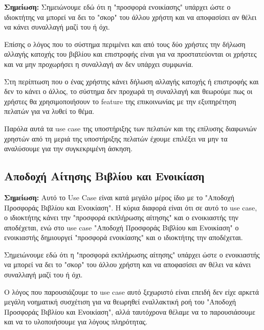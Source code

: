 \documentclass[12pt,a4paper]{article}
\begin{document}
\textbf{Σημείωση:} Σημειώνουμε εδώ ότι η "προσφορά ενοικίασης" υπάρχει ώστε ο ιδιοκτήτης να μπορεί να δει το "σκορ" του άλλου χρήστη και να αποφασίσει αν θέλει να κάνει συναλλαγή μαζί του ή όχι.

Επίσης ο λόγος που το σύστημα περιμένει και από τους δύο χρήστες την δήλωση αλλαγής κατοχής του βιβλίου και επιστροφής είναι για να προστατεύονται οι χρήστες και να μην προχωρήσει η συναλλαγή αν δεν υπάρχει συμφωνία.

Στη περίπτωση που ο ένας χρήστης κάνει δήλωση αλλαγής κατοχής ή επιστροφής και δεν το κάνει ο άλλος, το σύστημα δεν προχωρά τη συναλλαγή και θεωρούμε πως οι χρήστες θα χρησιμοποιήσουν το feature της επικοινωνίας με την εξυπηρέτηση πελατών για να λυθεί το θέμα.

Παρόλα αυτά τα use case της υποστήριξης των πελατών και της επίλυσης διαφωνιών χρηστών από τη μεριά της υποστήριξης πελατών έχουμε επιλέξει να μην τα αναλύσουμε για την συγκεκριμένη άσκηση.


\subsection{Αποδοχή Αίτησης Βιβλίου και Ενοικίαση}

\textbf{Σημείωση:} Αυτό το Use Case είναι κατά μεγάλο μέρος ίδιο με το "Αποδοχή Προσφοράς Βιβλίου και Ενοικίαση". Η κύρια διαφορά είναι ότι σε αυτό το use case, ο ιδιοκτήτης κάνει την "προσφορά εκπλήρωσης αίτησης" και ο ενοικιαστής την αποδέχεται, ενώ στο use case "Αποδοχή Προσφοράς Βιβλίου και Ενοικίαση" ο ενοικιαστής δημιουργεί "προσφορά ενοικίασης" και ο ιδιοκτήτης την αποδέχεται.

Σημειώνουμε εδώ ότι η "προσφορά εκπλήρωσης αίτησης" υπάρχει ώστε ο ενοικιαστής να μπορεί να δει το "σκορ" του άλλου χρήστη και να αποφασίσει αν θέλει να κάνει συναλλαγή μαζί του ή όχι.

Ο λόγος που παρουσιάζουμε το use case αυτό ξεχωριστό είναι επειδή δεν είχε αρκετά μεγάλη νοηματική συσχέτιση για να θεωρηθεί εναλλακτική ροή του "Αποδοχή Προσφοράς Βιβλίου και Ενοικίαση", αλλά ταυτόχρονα θέλαμε να το παρουσιάσουμε και να το υλοποιήσουμε για λόγους πληρότητας.
\end{document}
